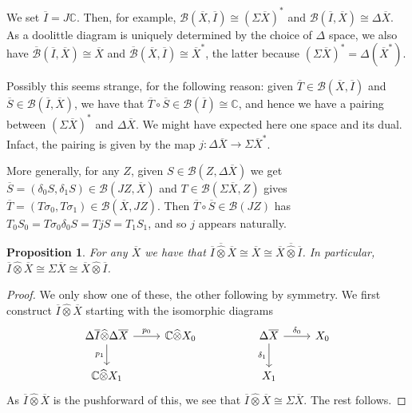 \documentclass[a4paper,11pt]{article}
\theoremstyle{plain}
\newtheorem{proposition}{Proposition}[section]
\theoremstyle{remark}
\newenvironment{remark}
  {\pushQED{\qed}\renewcommand{\qedsymbol}{$\triangle$}\remarkx}
  {\popQED\endremarkx}
\newcommand{\mc}[1]{\mathcal{#1}}
\newcommand{\proten}{\widehat\otimes}
\begin{document}
We set $\overline I = J\mathbb C$.  Then, for example, $\mc B(\overline X,\overline I) \cong(\Sigma\overline X)^*$ and $\mc B(\overline I, \overline X) \cong \Delta\overline X$.  As a doolittle diagram is uniquely determined by the choice of $\Delta$ space, we also have $\overline{\mc B}(\overline I, \overline X) \cong \overline X$ and $\overline{\mc B}(\overline X,\overline I) \cong \overline X^*$, the latter because $(\Sigma\overline X)^* = \Delta(\overline X^*)$.

\begin{remark}
Possibly this seems strange, for the following reason: given $\overline T\in\mc B(\overline X,\overline I)$ and $\overline S\in\mc B(\overline I,\overline X)$, we have that $\overline T \circ \overline S \in \mc B(\overline I) \cong \mathbb C$, and hence we have a pairing between $(\Sigma\overline X)^*$ and $\Delta\overline X$.  We might have expected here one space and its dual.  Infact, the pairing is given by the map $j\colon \Delta\overline X\to\Sigma\overline X^*$.

More generally, for any $Z$, given $S\in\mc B(Z, \Delta\overline X)$ we get $\overline S = (\delta_0S, \delta_1S) \in\mc B(JZ, \overline X)$ and $T\in\mc B(\Sigma\overline X, Z)$ gives $\overline T = (T\sigma_0, T\sigma_1) \in \mc B(\overline X, JZ)$.  Then $\overline T\circ\overline S \in \mc B(JZ)$ has $T_0S_0 = T\sigma_0 \delta_0 S = T j S = T_1S_1$, and so $j$ appears naturally.
\end{remark}

\begin{proposition}\label{prop:tensor_unit}
For any $\overline X$ we have that $\overline I \overline\proten \overline X \cong \overline X \cong \overline X \overline\proten \overline I$.  In particular, $\overline I \proten \overline X \cong \Sigma \overline X \cong \overline X \proten \overline I$.
\end{proposition}
\begin{proof}
We only show one of these, the other following by symmetry.  We first construct $\overline I \proten \overline X$ starting with the isomorphic diagrams
\[ \begin{tikzcd}
\Delta\overline I \proten \Delta\overline X \arrow[r, "p_0"] \arrow[d, "p_1"'] & \mathbb C \proten X_0  & &
\Delta\overline X \arrow[r, "\delta_0"] \arrow[d, "\delta_1"']  & X_0
\\
\mathbb C\proten X_1  & & &  X_1
\end{tikzcd} \]
As $\overline I \proten \overline X$ is the pushforward of this, we see that $\overline I \proten \overline X \cong \Sigma\overline X$.  The rest follows.
\end{proof}
\end{document}
